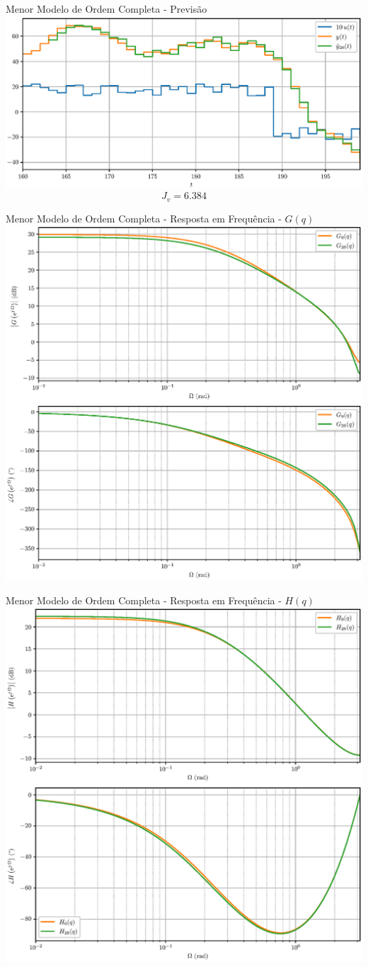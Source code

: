 \documentclass{beamer}
\begin{document}
\begin{frame}{Menor Modelo de Ordem Completa - Previsão}
  \includegraphics[width=\linewidth]{y_p_28}
  \begin{equation}
    J_v = \num{6.384}
  \end{equation}
\end{frame}

\begin{frame}{Menor Modelo de Ordem Completa - Resposta em Frequência - $G(q)$}
  \centering
  \includegraphics[width=0.7\linewidth]{bode_G_28}
\end{frame}

\begin{frame}{Menor Modelo de Ordem Completa - Resposta em Frequência - $H(q)$}
  \centering
  \includegraphics[width=0.7\linewidth]{bode_H_28}
\end{frame}

{
}
\end{document}
